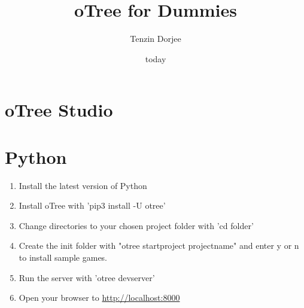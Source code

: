 \documentclass{article}
\title{oTree for Dummies}
\date{today}
\author{Tenzin Dorjee}
\begin{document}
  \maketitle
  \newpage

  \section{oTree Studio}
  \section{Python}
    \begin{enumerate}
      \item Install the latest version of Python
      \item Install oTree with 'pip3 install -U otree'
      \item Change directories to your chosen project folder with 'cd folder'
      \item Create the init folder with "otree startproject projectname" and enter y or n to
	  install sample games.
      \item Run the server with 'otree devserver'
      \item Open your browser to \url{http://localhost:8000}
    \end{enumerate}
\end{document}
